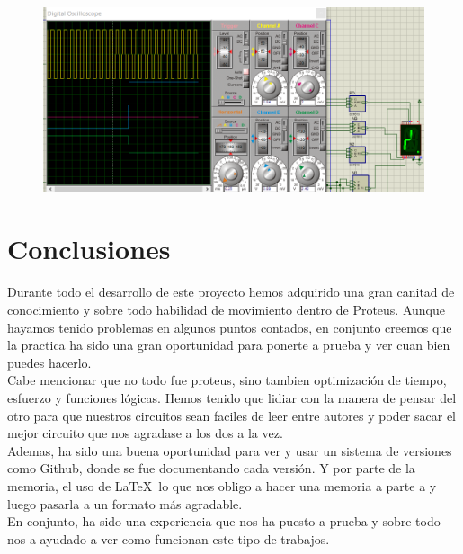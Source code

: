 \documentclass{article}
\begin{document}
\begin{figure}[!h]
    \centering
    \includegraphics[scale=0.5]{4.PNG}
\end{figure}

\newpage
\section{Conclusiones}
Durante todo el desarrollo de este proyecto hemos adquirido una gran canitad de conocimiento y sobre todo habilidad de movimiento dentro de Proteus. Aunque hayamos tenido problemas en algunos puntos contados, en conjunto creemos que la practica ha sido una gran oportunidad para ponerte a prueba y ver cuan bien puedes hacerlo.\\

Cabe mencionar que no todo fue proteus, sino tambien optimización de tiempo, esfuerzo y funciones lógicas. Hemos tenido que lidiar con la manera de pensar del otro para que nuestros circuitos sean faciles de leer entre autores y poder sacar el mejor circuito que nos agradase a los dos a la vez.\\

Ademas, ha sido una buena oportunidad para ver y usar un sistema de versiones como Github, donde se fue documentando cada versión. Y por parte de la memoria, el uso de \LaTeX  lo que nos obligo a hacer una memoria a parte a  y luego pasarla a un formato más agradable.\\

En conjunto, ha sido una experiencia que nos ha puesto a prueba y sobre todo nos a ayudado a ver como funcionan este tipo de trabajos.
\end{document}
